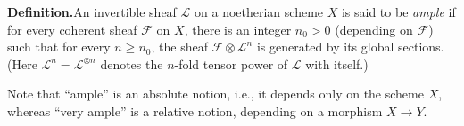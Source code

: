 {\par\smallskip\noindent\textbf{Definition.}\enspace An invertible sheaf $\mathcal L$ on a noetherian scheme $X$ is said to be \emph{ample} if for every coherent sheaf $\mathcal F$ on $X$, there is an integer $n_0>0$ (depending on $\mathcal F$) such that for every $n\geqslant n_0$, the sheaf $\mathcal F\otimes\mathcal L^n$ is generated by its global sections. (Here $\mathcal L^n=\mathcal L^{\otimes n}$ denotes the $n$-fold tensor power of $\mathcal L$ with itself.)

 Note that \textquotedblleft{}ample\textquotedblright{} is an absolute notion, i.e., it depends only on the scheme $X$, whereas \textquotedblleft{}very ample\textquotedblright{} is a relative notion, depending on a morphism $X\to Y$.
}
